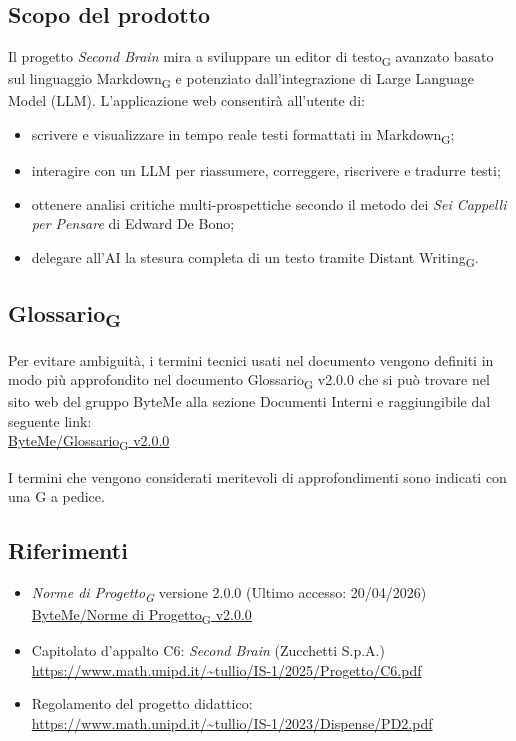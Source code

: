 \documentclass[11pt,a4paper]{article}
\newcommand{\gls}[1]{#1\textsubscript{G}}
\begin{document}
\subsection{Scopo del prodotto}
Il progetto \textit{Second Brain} mira a sviluppare un \gls{editor di testo} avanzato basato sul linguaggio \gls{Markdown} e potenziato dall'integrazione di Large Language Model (LLM).
L'applicazione web consentirà all'utente di:
\begin{itemize}
  \item scrivere e visualizzare in tempo reale testi formattati in \gls{Markdown};
  \item interagire con un LLM per riassumere, correggere, riscrivere e tradurre testi;
  \item ottenere analisi critiche multi-prospettiche secondo il metodo dei \textit{Sei Cappelli per Pensare} di Edward De Bono;
  \item delegare all'AI la stesura completa di un testo tramite \gls{Distant Writing}.
\end{itemize}
 
\subsection{\gls{Glossario}}
Per evitare ambiguità, i termini tecnici usati nel documento vengono definiti in modo più approfondito nel documento \gls{Glossario} v2.0.0 che si può trovare nel sito web del gruppo ByteMe alla sezione Documenti Interni e raggiungibile dal seguente link:\\
\href{https://byteme25.github.io/ByteMe/files.html}{ByteMe/\gls{Glossario} v2.0.0}

I termini che vengono considerati meritevoli di approfondimenti sono indicati con una G a pedice.


\subsection{Riferimenti}
\begin{itemize}
  \item \textit{\gls{Norme di Progetto}} versione 2.0.0 (Ultimo accesso: 20/04/2026)\\
  \href{https://byteme25.github.io/ByteMe/files.html}{ByteMe/\gls{Norme di Progetto} v2.0.0}
  \item Capitolato d'appalto C6: \textit{Second Brain} (Zucchetti S.p.A.)\\ \url{https://www.math.unipd.it/~tullio/IS-1/2025/Progetto/C6.pdf}
  \item Regolamento del progetto didattico:\\
        \url{https://www.math.unipd.it/~tullio/IS-1/2023/Dispense/PD2.pdf}
\end{itemize}
 
\end{document}
